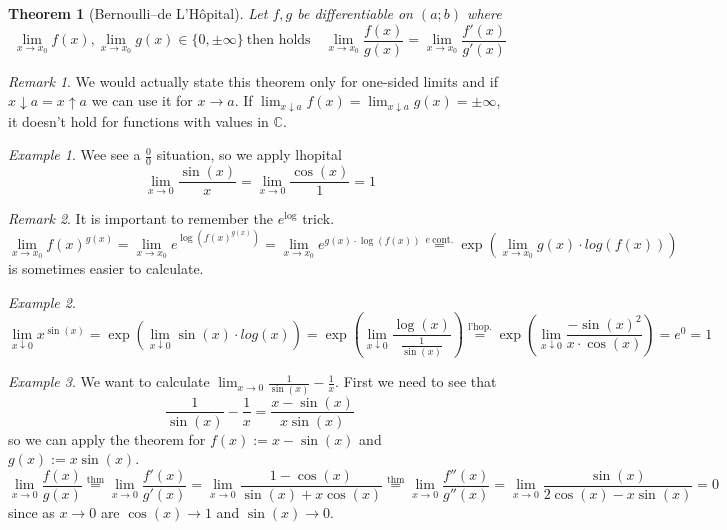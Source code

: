\documentclass[english,titlepage]{uzhpub}
\theoremstyle{definition}
\theoremstyle{plain}
\newtheorem{theorem}[definition]{Theorem} %
\theoremstyle{remark}
\newtheorem*{remark}{Remark}
\theoremstyle{example}
\newtheorem*{example}{Example}
\begin{document}
   \begin{theorem}[Bernoulli--de L'H\^{o}pital]\label{thm:lhopital}
      Let \(f, g\) be differentiable on \((a; b)\) where
      \[\lim_{x \to x_0} f(x), \lim_{x \to x_0} g(x) \in \{0, \pm\infty\}~\text{then holds} \quad \lim_{x \to x_0} \frac{f(x)}{g(x)} = \lim_{x \to x_0} \frac{f'(x)}{g'(x)}\]
   \end{theorem}
   \begin{remark}
      We would actually state this theorem only for one-sided limits and if \(x \downarrow a = x \uparrow a\) we can use it for \(x \to a\).
      If \(\lim_{x \downarrow a} f(x) = \lim_{x \downarrow a} g(x) = \pm \infty\), it doesn't hold for functions with values in \(\mathbb{C}\).
   \end{remark}
   \begin{example}
      Wee see a \(\frac{0}{0}\) situation, so we apply lhopital
      \[\lim_{x \to 0} \frac{\sin(x)}{x} = \lim_{x \to 0} \frac{\cos(x)}{1} = 1\]
   \end{example}
   \begin{remark}
      It is important to remember the \(e^{\log}\) trick.
      \[\lim_{x \to x_0} f(x)^{g(x)} = \lim_{x \to x_0} e^{\log(f(x)^{g(x)})} = \lim_{x \to x_0} e^{g(x) \cdot \log(f(x))} \overset{e~\text{cont.}}{=} \exp \left(\lim_{x \to x_0} g(x) \cdot log(f(x))\right)\]
      is sometimes easier to calculate.
   \end{remark}
   \begin{example}
      \[\lim_{x \downarrow 0} x^{\sin(x)} = \exp\left(\lim_{x \downarrow 0} \sin(x) \cdot log(x)\right) = \exp\left(\lim_{x \downarrow 0} \frac{\log(x)}{\frac{1}{\sin(x)}}\right) \overset{\text{l'hop.}}{=} \exp\left(\lim_{x \downarrow 0} \frac{-\sin(x)^2}{x \cdot \cos(x)}\right) = e^0 = 1\]
   \end{example}
   \begin{example}
      We want to calculate \(\lim_{x \to 0} \frac{1}{\sin(x)} - \frac{1}{x}\).
      First we need to see that
      \[\frac{1}{\sin(x)} - \frac{1}{x} = \frac{x - \sin(x)}{x \sin(x)}\]
      so we can apply the theorem for \(f(x) := x - \sin(x)\) and \(g(x) := x \sin(x)\).
      \[\lim_{x \to 0} \frac{f(x)}{g(x)} \overset{\text{thm}}{=} \lim_{x \to 0} \frac{f'(x)}{g'(x)} = \lim_{x \to 0} \frac{1 - \cos(x)}{\sin(x) + x \cos(x)} \overset{\text{thm}}{=} \lim_{x \to 0} \frac{f''(x)}{g''(x)} = \lim_{x \to 0} \frac{\sin(x)}{2 \cos(x) - x \sin(x)} = 0\]
      since as \(x \to 0\) are \(\cos(x) \to 1\) and \(\sin(x) \to 0\).
   \end{example}
\end{document}
